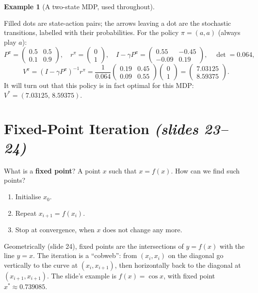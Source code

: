 \documentclass[11pt,a4paper]{article}
\newcommand{\slides}[1]{\texorpdfstring{\emph{(slides #1)}}{(slides #1)}}
\theoremstyle{plain}
\theoremstyle{definition}
\newtheorem{example}{Example}\renewcommand{\theexample}{E\arabic{example}}
\theoremstyle{remark}
\begin{document}
\begin{example}[A two-state MDP, used throughout]
\begin{center}
\end{center}
Filled dots are state-action pairs; the arrows leaving a dot are the stochastic transitions, labelled with their probabilities. For the policy $\pi=(a,a)$ (always play $a$):
\[
P^\pi=\begin{pmatrix}0.5&0.5\\0.1&0.9\end{pmatrix},\quad r^\pi=\begin{pmatrix}0\\1\end{pmatrix},\quad
I-\gamma P^\pi=\begin{pmatrix}0.55&-0.45\\-0.09&0.19\end{pmatrix},\quad \det=0.064,
\]
\[
V^\pi=(I-\gamma P^\pi)^{-1}r^\pi=\frac1{0.064}\begin{pmatrix}0.19&0.45\\0.09&0.55\end{pmatrix}\begin{pmatrix}0\\1\end{pmatrix}
=\begin{pmatrix}7.03125\\8.59375\end{pmatrix}.
\]
It will turn out that this policy is in fact optimal for this MDP: $V^*=(7.03125,\,8.59375)$.
\end{example}

\section{Fixed-Point Iteration \slides{23--24}}
What is a \textbf{fixed point}? A point $x$ such that $x=f(x)$. How can we find such points?
\begin{enumerate}[label=\arabic*.]
  \item Initialise $x_0$.
  \item Repeat $x_{i+1}=f(x_i)$.
  \item Stop at convergence, when $x$ does not change any more.
\end{enumerate}
Geometrically (slide 24), fixed points are the intersections of $y=f(x)$ with the line $y=x$. The iteration is a ``cobweb'': from $(x_i,x_i)$ on the diagonal go vertically to the curve at $(x_i,x_{i+1})$, then horizontally back to the diagonal at $(x_{i+1},x_{i+1})$. The slide's example is $f(x)=\cos x$, with fixed point $x^*\approx0.739085$.
\end{document}

